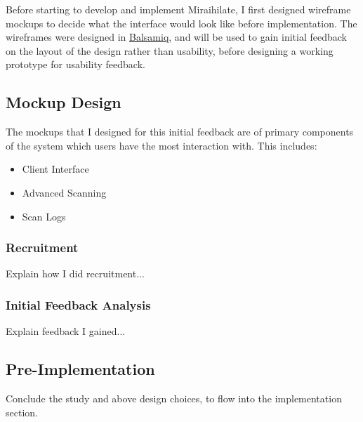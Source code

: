 Before starting to develop and implement Miraihilate, I first designed wireframe mockups to decide what the interface would look like before implementation. The wireframes were designed in \href{https://balsamiq.com}{Balsamiq}, and will be used to gain initial feedback on the layout of the design rather than usability, before designing a working prototype for usability feedback.

\subsection{Mockup Design}

The mockups that I designed for this initial feedback are of primary components of the system which users have the most interaction with. This includes:
\begin{itemize}
	\item{Client Interface}
	\item{Advanced Scanning}
	\item{Scan Logs}
\end{itemize}

\subsubsection{Recruitment}

Explain how I did recruitment...

\subsubsection{Initial Feedback Analysis}

Explain feedback I gained...

\subsection{Pre-Implementation}

Conclude the study and above design choices, to flow into the
implementation section.
